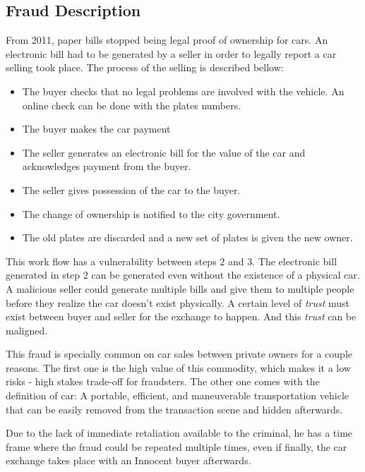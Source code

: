 \subsection{Fraud Description}
From 2011, paper bills stopped being legal proof of ownership for cars. An electronic bill had to be generated by a seller in order to legally report a car selling took place.
The process of the selling is described bellow:
\begin{itemize}
    \item The buyer checks that no legal problems are involved with the vehicle. An online check can be done with the plates numbers. 
    \item The buyer makes the car payment
    \item The seller generates an electronic bill for the value of the car and acknowledges payment from the buyer.
    \item The seller gives possession of the car to the buyer.
    \item The change of ownership is notified to the city government. 
    \item The old plates are discarded and a new set of plates is given the new owner.
\end{itemize}

This work flow has a vulnerability between steps $2$ and $3$. The electronic bill generated in step $2$ can be generated even without the existence of a physical car. A malicious seller could generate multiple bills and give them to multiple people before they realize the car doesn't exist physically. A certain level of \textit{trust} must exist between buyer and seller for the exchange to happen. And this \textit{trust} can be maligned. 

This fraud is specially common on car sales between private owners for a couple reasons. The first one is the high value of this commodity, which makes it a low risks - high stakes trade-off for fraudsters. The other one comes with the definition of car: A portable, efficient, and maneuverable transportation vehicle that can be easily removed from the transaction scene and hidden afterwards.

Due to the lack of immediate retaliation available to the criminal, he has a time frame where the fraud could be repeated multiple times, even if finally, the car exchange takes place with an Innocent buyer afterwards.